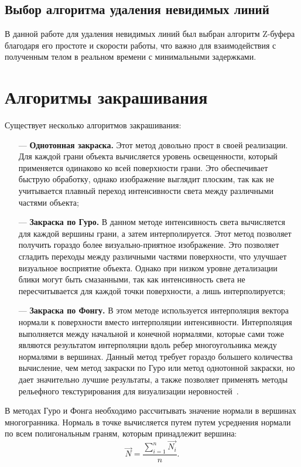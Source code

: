 \subsection{Выбор алгоритма удаления невидимых линий}
В данной работе для удаления невидимых линий был выбран алгоритм Z-буфера благодаря его простоте и скорости работы, что важно для взаимодействия с полученным телом в реальном времени с минимальными задержками.

\section{Алгоритмы закрашивания}
Существует несколько алгоритмов закрашивания:
\begin{itemize}
    \item[---] \textbf{Однотонная закраска.} Этот метод довольно прост в своей реализации. Для каждой грани объекта вычисляется уровень освещенности, который применяется одинаково ко всей поверхности грани. Это обеспечивает быструю обработку, однако изображение выглядит плоским, так как не учитывается плавный переход интенсивности света между различными частями объекта;
    \item[---] \textbf{Закраска по Гуро.} В данном методе интенсивность света вычисляется для каждой вершины грани, а затем интерполируется. Этот метод позволяет получить гораздо более визуально-приятное изображение. Это позволяет сгладить переходы между различными частями поверхности, что улучшает визуальное восприятие объекта. Однако при низком уровне детализации блики могут быть смазанными, так как интенсивность света не пересчитывается для каждой точки поверхности, а лишь интерполируется;
    \item[---] \textbf{Закраска по Фонгу.} В этом методе используется интерполяция вектора нормали к поверхности вместо интерполяции интенсивности. Интерполяция выполняется между начальной и конечной нормалями, которые сами тоже являются результатом интерполяции вдоль ребер многоугольника между нормалями в вершинах. Данный метод требует гораздо большего количества вычисление, чем метод закраски по Гуро или метод однотонной закраски, но дает значительно лучшие результаты, а также позволяет применять методы рельефного текстурирования для визуализации неровностей~\cite{Затенение_и_освещение}.
\end{itemize}


В методах Гуро и Фонга необходимо рассчитывать значение нормали в вершинах многогранника. Нормаль в точке вычисляется путем путем усреднения нормали по всем полигональным граням, которым принадлежит вершина:
\begin{equation}
    \vec{N} = \frac{\displaystyle\sum_{i=1}^n \vec{N_i}}{n}.
\end{equation}


